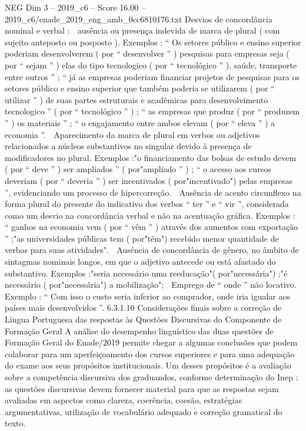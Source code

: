 \begin{textsample}{NEG Dim 3 – 2019\_c6 – Score 16.00 – 2019\_c6/enade\_2019\_eng\_amb\_0cc6810176.txt}
Desvios de concordância nominal e verbal :  ausência ou presença indevida de marca de plural ( com sujeito anteposto ou posposto ).
Exemplos : “ Os setores público e ensino superior poderiam desenvolverem ( por “ desenvolver ” ) pesquisas para empresas seja ( por “ sejam ” ) elas do tipo tecnologico ( por “ tecnológico ” ), saúde, transporte entre outros ” ; “ já as empresas poderiam financiar projetos de pesquisas para os setores público e ensino superior que também poderia se utilizarem ( por “ utilizar ” ) de suas partes estruturais e acadêmicas para desenvolvimento tecnologico ” ( por “ tecnológico ” ) ; “ as empresas que produz ( por “ produzem ” ) os materiais ” ; “ o engajamento entre ambos elevam ( por “ eleva ” ) a economia ”.  Aparecimento da marca de plural em verbos ou adjetivos relacionados a núcleos substantivos no singular devido à presença de modificadores no plural.
Exemplos :"o financiamento das bolsas de estudo devem ( por “ deve ” ) ser ampliados ” ( por"ampliado ” ) ; “ o acesso aos cursos deveriam ( por “ deveria ” ) ser incentivados ( por"incentivado") pelas empresas ”, evidenciando um processo de hipercorreção.  Ausência de acento circunflexo na forma plural do presente do indicativo dos verbos “ ter ” e “ vir ”, considerada como um desvio na concordância verbal e não na acentuação gráfica.
Exemplos : “ ganhos na economia vem ( por “ vêm ” ) através dos aumentos com exportação ” ;"as universidades públicas tem ( por"têm") recebido menor quantidade de verbas para suas atividades".  Ausência de concordância de gênero, no âmbito de sintagmas nominais longos, em que o adjetivo antecede ou está afastado do substantivo.
Exemplos :"seria necessário uma reeducação"( por"necessária") ;"é necessário ( por"necessária") a mobilização";  Emprego de “ onde ” não locativo.
Exemplo : “ Com isso o custo seria inferior ao comprador, onde iria igualar aos países mais desenvolvidos ”. 6.3.1.10 Considerações finais sobre a correção de Língua Portuguesa das respostas às Questões Discursivas do Componente de Formação Geral A análise do desempenho linguístico das duas questões de Formação Geral do Enade/2019 permite chegar a algumas conclusões que podem colaborar para um aperfeiçoamento dos cursos superiores e para uma adequação do exame aos seus propósitos institucionais.
Um desses propósitos é a avaliação sobre a competência discursiva dos graduandos, conforme determinação do Inep : as questões discursivas devem fornecer material para que as respostas sejam avaliadas em aspectos como clareza, coerência, coesão, estratégias argumentativas, utilização de vocabulário adequado e correção gramatical do texto.

\end{textsample}
